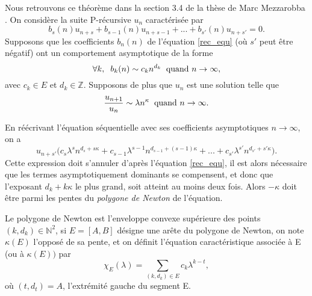 \documentclass[a4paper,10pt]{article}
\begin{document}
	Nous retrouvons ce théorème dans la section 3.4 de la thèse de Marc Mezzarobba \cite{Mezzarobba2011}.
	On considère la suite P-récursive $u_n$ caractérisée par
	\begin{equation}
		b_{s}(n)u_{n+s}+b_{s-1}(n)u_{n+s-1}+...+b_{s'}(n)u_{n+s'}=0.
		\label{rec_equ}
	\end{equation} 
	Supposons que les coefficients $b_{n}(n)$ de l'équation \eqref{rec_equ} (où $s'$ peut être négatif) ont un comportement asymptotique de la forme
	\[\forall k, \hspace{2mm} b_{k}(n) \sim c_{k}n^{d_{k}} \hspace{2mm} \text{quand } n \rightarrow \infty,\]
	avec $c_{k} \in E$ et $d_{k} \in \mathbb{Z}$. Supposons de plus que $u_{n}$ est une solution telle que  
	\[\frac{u_{n+1}}{u_{n}}\sim \lambda n^{\kappa} \hspace{2mm} \text{quand }n \rightarrow \infty.\]
	
	\noindent En réécrivant l'équation séquentielle avec ses coefficients asymptotiques $n \rightarrow \infty$, on a
	\[u_{n+s'}\Big(c_{s}\lambda^{s} n^{d_{s}+s\kappa}+c_{s-1}\lambda^{s-1} n^{d_{s-1}+(s-1)\kappa}+...+c_{s'}\lambda^{s'} n^{d_{s'}+s'\kappa}\Big).\]
	Cette expression doit s'annuler d'après l'équation \eqref{rec_equ}, il est alors nécessaire que les termes asymptotiquement dominants se compensent, et donc que l'exposant $d_{k}+k\kappa$ le plus grand, soit atteint au moins deux fois. Alors $-\kappa$ doit être parmi les pentes du \textit{polygone de Newton} de l'équation.
	
	\begin{definition} Le polygone de Newton est l'enveloppe convexe supérieure des points $(k, d_{k}) \in \mathbb{N}^{2}$, si $E=[A,B]$ désigne une arête du polygone de Newton, on note $\kappa(E)$ l'opposé de sa pente, et on définit l'équation caractéristique associée à E (ou à $\kappa(E))$ par
		\[\chi_{E}(\lambda)=\sum_{(k,d_{k}) \in E} c_{k}\lambda^{k-t},\]
		où $(t,d_{t})=A$, l'extrémité gauche du segment E.
	\end{definition}
	
\end{document}
